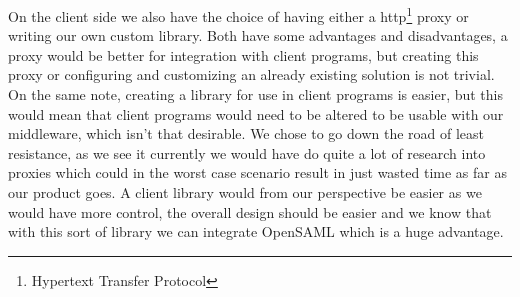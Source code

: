         On the client side we also have the choice of having either a \gls{http}\footnote{Hypertext Transfer Protocol} proxy or writing our own custom library. Both have some advantages and disadvantages, a proxy would be better for integration with client programs, but creating this proxy or configuring and customizing an already existing solution is not trivial. On the same note, creating a library for use in client programs is easier, but this would mean that client programs would need to be altered to be usable with our middleware, which isn’t that desirable. We chose to go down the road of least resistance, as we see it currently we would have do quite a lot of research into proxies which could in the worst case scenario result in just wasted time as far as our product goes. A client library would from our perspective be easier as we would have more control, the overall design should be easier and we know that with this sort of library we can integrate OpenSAML which is a huge advantage.  
          
